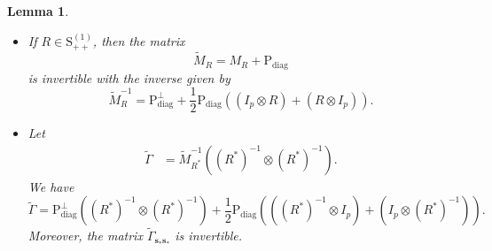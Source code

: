\documentclass[12pt]{amsart}
\numberwithin{equation}{section}
\numberwithin{equation}{section}
\theoremstyle{plain}
\newtheorem{lemma}{Lemma}
\theoremstyle{definition}
\newcommand{\Sppone}{\mathrm{S}_{++}^{(1)}}
\newcommand{\Supp}{\mathbf{s}_\ast}
\begin{document}
\begin{lemma}\label{lem:MRtilde}\ 
\begin{itemize}
    \item[(i)]

If $R\in\Sppone$, then the matrix 
\[
\tilde{M}_R = M_R+\mathrm{P}_{\mathrm{diag}} 
\]
is invertible with the inverse given by
    \[
\tilde{M}_R^{-1}=\mathrm{P}_{\mathrm{diag}}^\bot+\frac12\mathrm{P}_{\mathrm{diag}}((I_p\otimes R)+(R\otimes I_p)).
    \]
    \item[(ii)] Let
\begin{align}\label{eq:Gammatilde}
    \tilde{\Gamma}&=\tilde{M}_{R^\ast}^{-1}((R^\ast)^{-1}\otimes (R^\ast)^{-1}).
\end{align}
    We have 
    \[
    \tilde{\Gamma}=\mathrm{P}_{\mathrm{diag}}^\bot((R^\ast)^{-1}\otimes(R^\ast)^{-1})+\frac12\mathrm{P}_{\mathrm{diag}}(((R^\ast)^{-1}\otimes I_p)+(I_p\otimes (R^\ast)^{-1})).
\]
Moreover, the matrix $\tilde{\Gamma}_{\Supp\Supp}$ is invertible.
\end{itemize}
\end{lemma}
\end{document}
